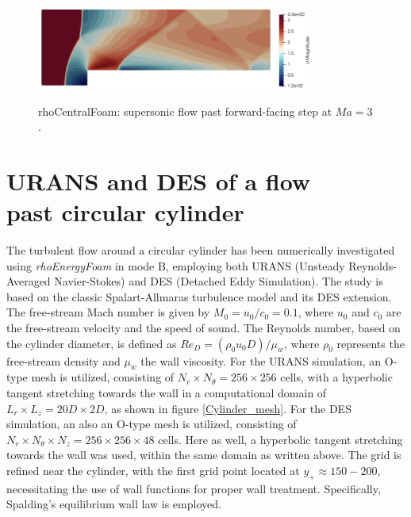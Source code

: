 \documentclass[a5paper]{sapthesis}
\begin{document}
	\begin{figure}
		\centering
		\subfloat
		{\includegraphics[width=0.7\textwidth]{Figures/FS_rcf}} \quad 
		\subfloat
		\centering
		{\includegraphics[width=0.1\textwidth, height=0.16\textheight]{Figures/FS_velocitybar}}
		\caption{rhoCentralFoam: supersonic ﬂow past forward-facing step at $Ma = 3$.}
		\label{FS_rcf}
	\end{figure}
	
	\section{URANS and DES of a flow \\ past circular cylinder}
	The turbulent flow around a circular cylinder has been numerically investigated using \textit{rhoEnergyFoam} in mode B, employing both URANS (Unsteady Reynolds-Averaged Navier-Stokes) and DES (Detached Eddy Simulation). The study is based on the classic Spalart-Allmaras turbulence model and its DES extension. The free-stream Mach number is given by $M_0 = u_0/c_0 = 0.1$,	where $u_0$ and $c_0$ are the free-stream velocity and the speed of sound. The Reynolds number, based on the cylinder diameter, is defined as $Re_D = (\rho_0 u_0 D)/\mu_w$, where $\rho_0$ represents the free-stream density and $\mu_w$ the wall viscosity. For the URANS simulation, an O-type mesh is utilized, consisting of $ N_r \times N_\theta = 256 \times 256 $ cells, with a hyperbolic tangent stretching towards the wall in a computational domain of $ L_r \times L_z = 20D \times 2D $, as shown in figure \ref{Cylinder_mesh}. For the DES simulation, an also an O-type mesh is utilized, consisting of $ N_r \times N_\theta \times N_z = 256 \times 256 \times 48 $ cells. Here as well, a hyperbolic tangent stretching towards the wall was used, within the same domain as written above. The grid is refined near the cylinder, with the first grid point located at $ y_+ \approx 150 - 200 $, necessitating the use of wall functions for proper wall treatment. Specifically, Spalding’s equilibrium wall law \cite{spalding1961single} is employed. 
	
\end{document}
